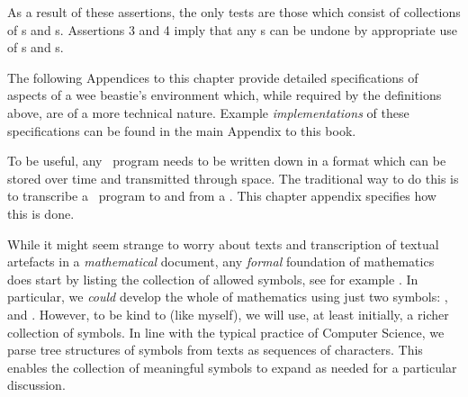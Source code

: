 

As a result of these assertions, the only  tests are 
those which consist of collections of s and 
s. Assertions 3 and 4 imply that any 
s can be undone by appropriate use of 
s and s.  

\startChapterAppendices

The following Appendices to this chapter provide detailed specifications 
of aspects of a wee beastie's environment which, while required by the 
definitions above, are of a more technical nature. Example 
\emph{implementations} of these specifications can be found in the 
main Appendix \in[implementation] to this book.

\chapterAppendix[title={Texts: transcribing Lists of Lists}]

To be useful, any \joylol\ program needs to be written down in a format 
which can be stored over time and transmitted through space. The 
traditional way to do this is to transcribe a \joylol\ program to and from 
a . This chapter appendix specifies how this 
is done. 

While it might seem strange to worry about texts and transcription of 
textual artefacts in a \emph{mathematical} document, any \emph{formal} 
foundation of mathematics does start by listing the collection of allowed 
symbols, see for example \cite{kleene2009introMetaMathematics}. In 
particular, we \emph{could} develop the whole of mathematics using just 
two symbols: \quote{(}, and \quote{)}. However, to be kind to  (like myself), we will use, at least initially, a 
richer collection of symbols. In line with the typical practice of 
Computer Science, we parse tree structures of symbols from texts as 
sequences of characters. This enables the collection of meaningful symbols 
to expand as needed for a particular discussion. 

